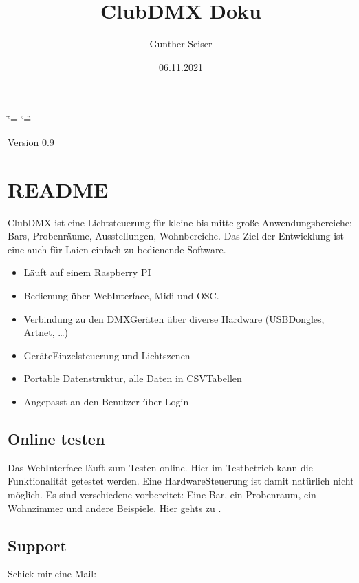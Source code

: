 \documentclass[letterpaper,10pt,ngerman]{sphinxmanual}
\title{ClubDMX Doku}
\date{06.11.2021}
\author{Gunther Seiser}
\begin{document}
\ifdefined\shorthandoff
  \ifnum\catcode`\=\string=\active\shorthandoff{=}\fi
  \ifnum\catcode`\"=\active{}\fi
\fi

\pagestyle{empty}
\sphinxmaketitle
\pagestyle{plain}
\sphinxtableofcontents
\pagestyle{normal}
\label{\detokenize{inhalt::doc}}


Version 0.9


\chapter{README}
\label{\detokenize{readme:readme}}\label{\detokenize{readme::doc}}
ClubDMX ist eine Lichtsteuerung für kleine bis mittelgroße Anwendungsbereiche:
Bars, Probenräume, Ausstellungen, Wohnbereiche. Das Ziel der Entwicklung ist
eine auch für Laien einfach zu bedienende Software.
\begin{itemize}
\item {} 
Läuft auf einem Raspberry PI

\item {} 
Bedienung über Web\sphinxhyphen{}Interface, Midi und OSC.

\item {} 
Verbindung zu den DMX\sphinxhyphen{}Geräten über diverse Hardware
(USB\sphinxhyphen{}Dongles, Artnet, …)

\item {} 
Geräte\sphinxhyphen{}Einzelsteuerung und Lichtszenen

\item {} 
Portable Datenstruktur, alle Daten in CSV\sphinxhyphen{}Tabellen

\item {} 
Angepasst an den Benutzer über Login

\end{itemize}


\section{Online testen}
\label{\detokenize{readme:online-testen}}
Das Web\sphinxhyphen{}Interface läuft zum Testen online. Hier im Testbetrieb kann die
Funktionalität getestet werden. Eine Hardware\sphinxhyphen{}Steuerung ist damit natürlich
nicht möglich. Es sind verschiedene  vorbereitet: Eine Bar,
ein Probenraum, ein Wohnzimmer und andere Beispiele. Hier gehts zu
 .


\section{Support}
\label{\detokenize{readme:support}}
Schick mir eine Mail: 
\end{document}
